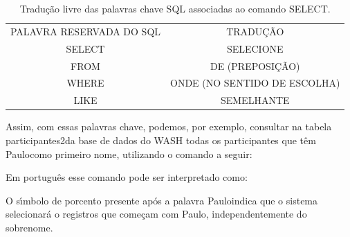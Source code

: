 \documentclass[
12pt,		%
openright,	%
twoside,  %
a4paper,			%
chapter=TITLE,		%
english,			%
french,				%
spanish,			%
brazil				%
]{USPSC-classe/USPSC}
\begin{document}
\begin{table}[htb]
\tiny
\caption{\label{83e82c686b7298dd0bc7475778644f6681053be7}Tradu\c{c}\~ao livre das palavras chave SQL associadas ao comando SELECT.}

\centering
\begin{tabular}{|c|c|}
\hline
PALAVRA RESERVADA DO SQL  &  TRADU\c{C}\~AO \\
SELECT  &  SELECIONE \\
FROM  &  DE (PREPOSI\c{C}\~AO) \\
WHERE  &  ONDE (NO SENTIDO DE ESCOLHA) \\
LIKE  &  SEMELHANTE \\
\hline
\end{tabular}
\end{table}


Assim, com essas palavras chave, podemos, por exemplo, consultar na tabela \textquotedbl participantes2\textquotedbl  da base de dados do WASH todas os participantes que t\^em \textquotedbl Paulo\textquotedbl  como primeiro nome, utilizando o comando a seguir:











\noindent\begin{center}\mbox{\centering{}}\end{center}


Em portugu\^es esse comando pode ser interpretado como:











\noindent\begin{center}\mbox{\centering{}}\end{center}


O s\'{\i}mbolo de porcento presente ap\'os a palavra \textquotedbl Paulo\textquotedbl  indica que o sistema selecionar\'a o registros que come\c{c}am com \textquotedbl Paulo\textquotedbl , independentemente do sobrenome.
\end{document}
